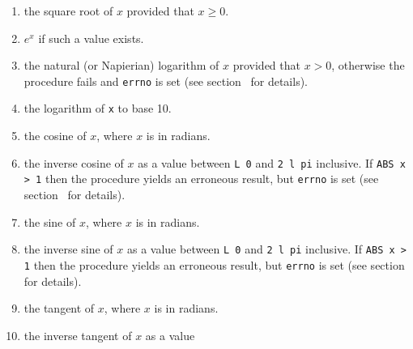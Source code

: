 \begin{enumerate}
\item {} \newline
{} the square root of $x$ provided that $x\geq0$.
\item {} \newline
{} $e^x$ if such a value exists.
\item {} \newline
{} the natural (or Napierian) logarithm of $x$
provided that $x>0$, otherwise the procedure fails and \verb|errno|
is set (see section~ for details).
\item {} \newline
{} the logarithm of \verb|x| to base 10.
\item {} \newline
{} the cosine of $x$, where $x$ is in radians.
\item {}
\newline
{} the inverse cosine of $x$ as a value
between \verb|L 0| and \verb|2 l pi| inclusive. If \verb|ABS x > 1|
then the procedure yields an erroneous result, but \verb|errno| is
set (see section~ for details).
\item {}
\newline
{} the sine of $x$, where $x$ is in radians.
\item {}
\newline
{} the inverse sine of $x$ as a value
between \verb|L 0| and \verb|2 l pi| inclusive. If \verb|ABS x > 1|
then the procedure yields an erroneous result, but \verb|errno| is
set (see section~ for details).
\item {}\newline
{} the tangent of $x$, where $x$ is in radians.
\item {}
\newline
{} the inverse tangent of $x$ as a value

\end{enumerate}

